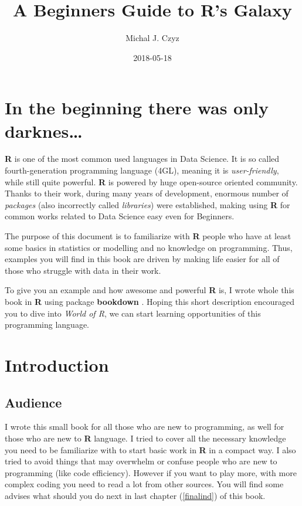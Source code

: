 \documentclass[]{book}
\title{A Beginners Guide to R's Galaxy}
\author{Michal J. Czyz}
\date{2018-05-18}
\theoremstyle{definition}
\theoremstyle{definition}
\theoremstyle{definition}
\theoremstyle{remark}
\begin{document}
\maketitle

{
\hypersetup{linkcolor=black}
\setcounter{tocdepth}{1}
\tableofcontents
}
\chapter{In the beginning there was only
darknes\ldots{}}\label{in-the-beginning-there-was-only-darknes}

\textbf{R} \citep{rcore2017} is one of the most common used languages in
Data Science. It is so called fourth-generation programming language
(4GL), meaning it is \emph{user-friendly}, while still quite powerful.
\textbf{R} is powered by huge open-source oriented community. Thanks to
their work, during many years of development, enormous number of
\emph{packages} (also incorrectly called \emph{libraries}) were
established, making using \textbf{R} for common works related to Data
Science easy even for Beginners.

The purpose of this document is to familiarize with \textbf{R} people
who have at least some basics in statistics or modelling and no
knowledge on programming. Thus, examples you will find in this book are
driven by making life easier for all of those who struggle with data in
their work.

To give you an example and how awesome and powerful \textbf{R} is, I
wrote whole this book in \textbf{R} using package \textbf{bookdown}
\citep{xie2016, R-bookdown}. Hoping this short description encouraged
you to dive into \emph{World of R}, we can start learning opportunities
of this programming language.

\chapter{Introduction}\label{intro}

\section{Audience}\label{audience}

I wrote this small book for all those who are new to programming, as
well for those who are new to \textbf{R} language. I tried to cover all
the necessary knowledge you need to be familiarize with to start basic
work in \textbf{R} in a compact way. I also tried to avoid things that
may overwhelm or confuse people who are new to programming (like code
efficiency). However if you want to play more, with more complex coding
you need to read a lot from other sources. You will find some advises
what should you do next in last chapter (\ref{finalind}) of this book.
\end{document}
